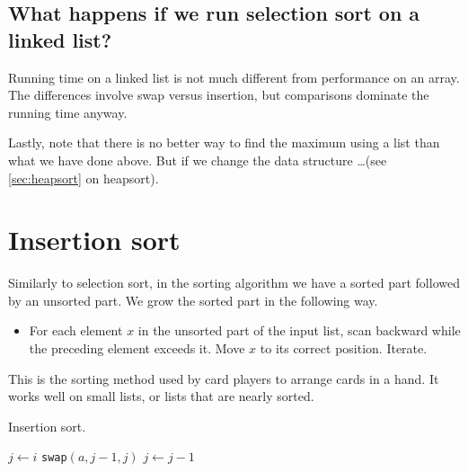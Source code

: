 \section{What happens if we run selection sort on a linked list?}
Running time on a linked list is not much different from performance on an array. 
The differences involve swap versus insertion, but comparisons dominate the running time anyway.

Lastly, note that there is no better way to find the maximum using a list than what we have done above. 
But if we change the data structure \dots (see \cref{sec:heapsort} on heapsort).


\chapter{Insertion sort} %
\label{sec:insertionsort}
Similarly to selection sort, in the  sorting algorithm we have a sorted part followed by an unsorted part.
We grow the sorted part in the following way.
\begin{itemize}
	\item For each element $x$ in the unsorted part of the input list, 
	scan backward while the preceding element exceeds it. 
	Move $x$ to its correct position. Iterate.
\end{itemize}
This is the sorting method used by card players to arrange cards in a hand.
It works well on small lists, or lists that are nearly sorted.

\begin{algorithm}[H]
  \caption{Insertion sort.}
    \label{alg:insort2}
\begin{algorithmic}[1]
	  
		\State $j \gets i$  
			\State {}
			\State \texttt{swap}$(a,j-1,j)$
			\State $j \gets j - 1$
		\EndWhile
	\EndFor
	\State {}
\EndFunction  
\end{algorithmic}
\end{algorithm}

